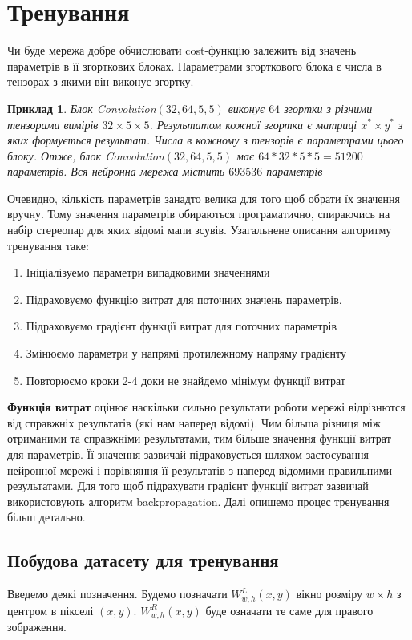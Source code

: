 \documentclass[11pt]{article}
\newtheorem*{example*}{Приклад}
\theoremstyle{definition}
\begin{document}
\newpage

\section{Тренування}
Чи буде мережа добре обчислювати cost-функцію залежить від значень параметрів в її згорткових блоках. Параметрами згорткового блока є числа в тензорах з якими він виконує згортку.
\begin{example*}
	Блок \textit{Convolution}$(32, 64, 5, 5)$ виконує $64$ згортки з різними тензорами вимірів $32 \times 5 \times 5$. Результатом кожної згортки є матриці $x^* \times y^*$ з яких формується результат. Числа в кожному з тензорів є параметрами цього блоку. Отже, блок \textit{Convolution}$(32, 64, 5, 5)$ має $64 * 32 * 5 * 5 = 51200$ параметрів. Вся нейронна мережа містить $693536$ параметрів
\end{example*} 

Очевидно, кількість параметрів занадто велика для того щоб обрати їх значення вручну. 
Тому значення параметрів обираються програматично, спираючись на набір стереопар для яких відомі мапи зсувів. Узагальнене описання алгоритму тренування таке:
\begin{enumerate}
	\item Ініціалізуемо параметри випадковими значеннями
	\item Підраховуємо функцію витрат для поточних значень параметрів. 
	\item Підраховуємо градієнт функції витрат для поточних параметрів
	\item Змінюємо параметри у напрямі протилежному напряму градієнту
	\item Повторюємо кроки 2-4 доки не знайдемо мінімум функції витрат
\end{enumerate}

\textbf{Функція витрат} оцінює наскільки сильно результати роботи мережі відрізнются від справжніх результатів (які нам наперед відомі). Чим більша різниця між отриманими та справжніми результатами, тим більше значення функції витрат для параметрів. Її значення зазвичай підраховується шляхом застосування нейронної мережі і порівняння її результатів з наперед відомими правильними результатами. Для того щоб підрахувати градієнт функції витрат зазвичай використовують алгоритм backpropagation. Далі опишемо процес тренування більш детально.

\subsection{Побудова датасету для тренування}
Введемо деякі позначення. Будемо позначати $W^L_{w,h}(x,y)$ вікно розміру $w \times h$ з центром в пікселі $(x,y)$. $W^R_{w,h}(x,y)$ буде означати те саме для правого зображення.
\end{document}
